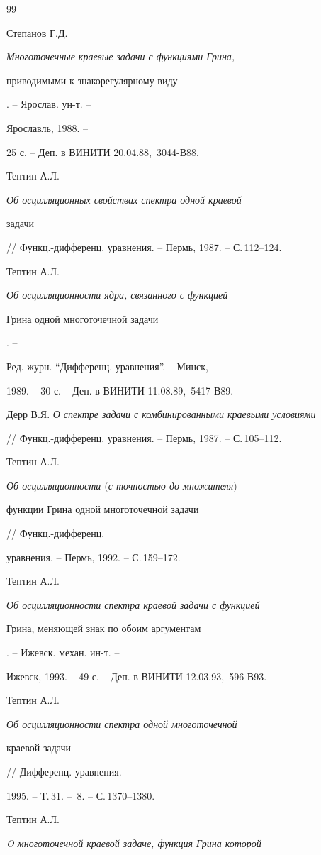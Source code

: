 \begin{thebibliography}{99}


Степанов Г.Д. {\em Многоточечные краевые задачи с функциями Грина, 


приводимыми к знакорегулярному виду}. -- Ярослав. ун-т. -- 


Ярославль, 1988. -- 


25 с. -- Деп. в ВИНИТИ 20.04.88, \No\,3044-В88. 




Тептин А.Л. {\em Об осцилляционных свойствах спектра одной краевой 


задачи} // Функц.-дифференц. уравнения. -- Пермь, 1987. -- С.\,112--124. 




Тептин А.Л. {\em Об осцилляционности ядра, связанного с функцией 


Грина одной многоточечной задачи}. -- 


Ред. журн. ``Дифференц. уравнения''. -- Минск, 


1989. -- 30 с. -- Деп. в ВИНИТИ 11.08.89, \No\,5417-В89. 




Дерр В.Я. {\em О спектре задачи с комбинированными краевыми условиями} 


// Функц.-дифференц. уравнения. -- Пермь, 1987. -- С.\,105--112. 




Тептин А.Л. {\em Об осцилляционности $($с точностью до множителя$)$ 


функции Грина одной многоточечной задачи} // Функц.-дифференц. 


уравнения. -- Пермь, 1992. -- С.\,159--172. 




Тептин А.Л. {\em Об осцилляционности спектра краевой задачи с функцией 


Грина, меняющей знак по обоим аргументам}. -- Ижевск. механ. ин-т. -- 


Ижевск, 1993. -- 49 с. -- Деп. в ВИНИТИ 12.03.93, \No\,596-В93. 




Тептин А.Л. {\em Об осцилляционности спектра одной многоточечной 


краевой задачи} // Дифференц. уравнения. -- 


1995. -- Т.\,31. -- \No\,8. -- С.\,1370--1380. 




Тептин А.Л. {\em O многоточечной краевой задаче, функция Грина которой 


}
\end{thebibliography}
